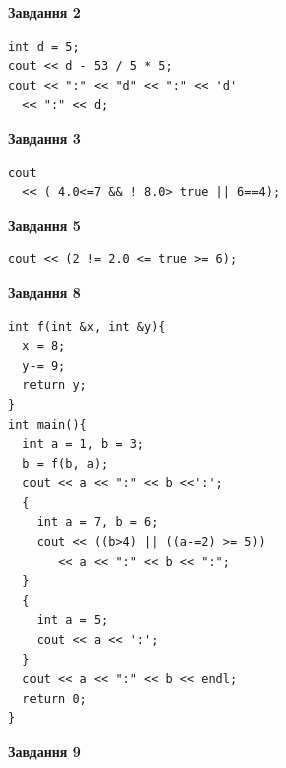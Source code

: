 \documentclass[12pt, ukrainian]{article}
\begin{document}
{\begin {large}
\begin{minipage}[t]{7.0cm}
\end{minipage}
\vline \hspace{1mm}
\begin{minipage}[t]{11.0cm}

\begin{center}
\textbf{Завдання 2}
\end{center}
\vspace{-8mm}

\begin{verbatim}
int d = 5;
cout << d - 53 / 5 * 5;
cout << ":" << "d" << ":" << 'd' 
  << ":" << d;
\end{verbatim}



\begin{center}
\textbf{Завдання 3}
\end{center}
\vspace{-8mm}

\begin{verbatim}
cout 
  << ( 4.0<=7 && ! 8.0> true || 6==4);
\end{verbatim}



\begin{center}
\textbf{Завдання 5}
\end{center}
\vspace{-8mm}

\begin{verbatim}
cout << (2 != 2.0 <= true >= 6);
\end{verbatim}



\begin{center}
\textbf{Завдання 8}
\end{center}
\vspace{-8mm}

\begin{verbatim}
int f(int &x, int &y){
  x = 8;
  y-= 9;
  return y;
}
int main(){
  int a = 1, b = 3;
  b = f(b, a);
  cout << a << ":" << b <<':';
  {
    int a = 7, b = 6;
    cout << ((b>4) || ((a-=2) >= 5))
       << a << ":" << b << ":";
  }
  {
    int a = 5;
    cout << a << ':';
  }
  cout << a << ":" << b << endl;
  return 0;
}
\end{verbatim}

\end{minipage}


\begin{minipage}[t]{7.0cm}

\begin{center}
\textbf{Завдання 9}
\end{center}
\vspace{-8mm}


\end{minipage}
\end{large}}
\end{document}
